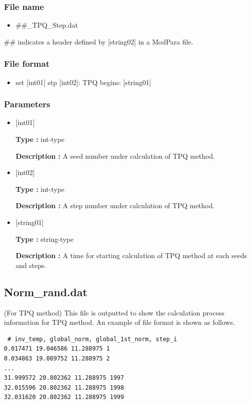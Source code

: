 \subsubsection{File name}
 \begin{itemize}
   \item  \#\#\_TPQ\_Step.dat
  \end{itemize}
  \#\# indicates a header defined by [string02] in a ModPara file.

\subsubsection{File format}
 \begin{itemize}
   \item set $[$int01$]$ stp $[$int02$]$: TPQ begins: $[$string01$]$
  \end{itemize}
\subsubsection{Parameters}
 \begin{itemize}

  \item  $[$int01$]$
  
 {\bf Type :} int-type

{\bf Description :} A seed number under calculation of TPQ method.
 
  \item  $[$int02$]$
  
 {\bf Type :} int-type

{\bf Description :} A step number under calculation of TPQ method.

  \item  $[$string01$]$
  
 {\bf Type :} string-type

{\bf Description :} A time for starting calculation of TPQ method at each seeds and steps.

 \end{itemize}


\newpage
\subsection{Norm\_rand.dat}
\label{Subsec:normrand}
(For TPQ method) This file is outputted to show the calculation process information for TPQ method.
An example of file format is shown as follows.\\
\begin{minipage}{12.5cm}
\begin{screen}
\begin{verbatim}
 # inv_temp, global_norm, global_1st_norm, step_i 
0.017471 19.046586 11.288975 1
0.034863 19.089752 11.288975 2
...
31.999572 20.802362 11.288975 1997
32.015596 20.802362 11.288975 1998
32.031620 20.802362 11.288975 1999
\end{verbatim}
\end{screen}
\end{minipage}


